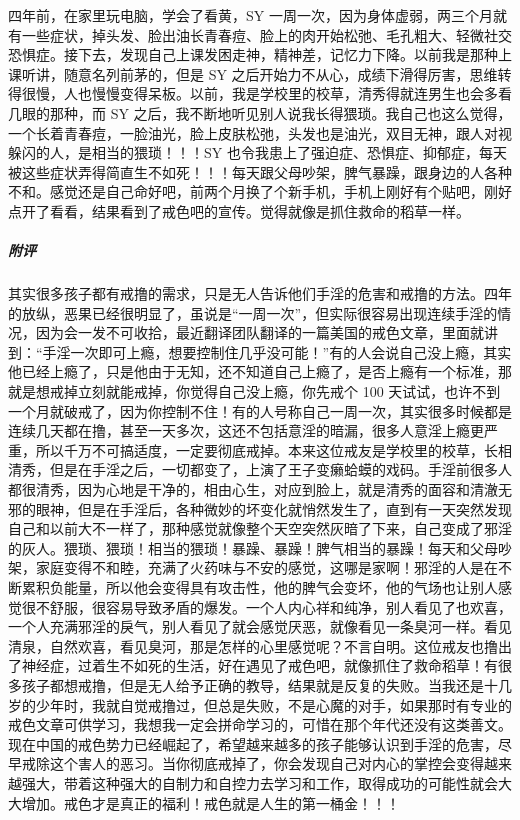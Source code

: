 \begin{case}
    四年前，在家里玩电脑，学会了看黄，SY 一周一次，因为身体虚弱，两三个月就有一些症状，掉头发、脸出油长青春痘、脸上的肉开始松弛、毛孔粗大、轻微社交恐惧症。接下去，发现自己上课发困走神，精神差，记忆力下降。以前我是那种上课听讲，随意名列前茅的，但是 SY 之后开始力不从心，成绩下滑得厉害，思维转得很慢，人也慢慢变得呆板。以前，我是学校里的校草，清秀得就连男生也会多看几眼的那种，而 SY 之后，我不断地听见别人说我长得猥琐。我自己也这么觉得，一个长着青春痘，一脸油光，脸上皮肤松弛，头发也是油光，双目无神，跟人对视躲闪的人，是相当的猥琐！！！SY 也令我患上了强迫症、恐惧症、抑郁症，每天被这些症状弄得简直生不如死！！！每天跟父母吵架，脾气暴躁，跟身边的人各种不和。感觉还是自己命好吧，前两个月换了个新手机，手机上刚好有个贴吧，刚好点开了看看，结果看到了戒色吧的宣传。觉得就像是抓住救命的稻草一样。
    \subparagraph{附评} 其实很多孩子都有戒撸的需求，只是无人告诉他们手淫的危害和戒撸的方法。四年的放纵，恶果已经很明显了，虽说是“一周一次”，但实际很容易出现连续手淫的情况，因为会一发不可收拾，最近翻译团队翻译的一篇美国的戒色文章，里面就讲到：“手淫一次即可上瘾，想要控制住几乎没可能！”有的人会说自己没上瘾，其实他已经上瘾了，只是他由于无知，还不知道自己上瘾了，是否上瘾有一个标准，那就是想戒掉立刻就能戒掉，你觉得自己没上瘾，你先戒个 100 天试试，也许不到一个月就破戒了，因为你控制不住！有的人号称自己一周一次，其实很多时候都是连续几天都在撸，甚至一天多次，这还不包括意淫的暗漏，很多人意淫上瘾更严重，所以千万不可搞适度，一定要彻底戒掉。本来这位戒友是学校里的校草，长相清秀，但是在手淫之后，一切都变了，上演了王子变癞蛤蟆的戏码。手淫前很多人都很清秀，因为心地是干净的，相由心生，对应到脸上，就是清秀的面容和清澈无邪的眼神，但是在手淫后，各种微妙的坏变化就悄然发生了，直到有一天突然发现自己和以前大不一样了，那种感觉就像整个天空突然灰暗了下来，自己变成了邪淫的灰人。猥琐、猥琐！相当的猥琐！暴躁、暴躁！脾气相当的暴躁！每天和父母吵架，家庭变得不和睦，充满了火药味与不安的感觉，这哪是家啊！邪淫的人是在不断累积负能量，所以他会变得具有攻击性，他的脾气会变坏，他的气场也让别人感觉很不舒服，很容易导致矛盾的爆发。一个人内心祥和纯净，别人看见了也欢喜，一个人充满邪淫的戾气，别人看见了就会感觉厌恶，就像看见一条臭河一样。看见清泉，自然欢喜，看见臭河，那是怎样的心里感觉呢？不言自明。这位戒友也撸出了神经症，过着生不如死的生活，好在遇见了戒色吧，就像抓住了救命稻草！有很多孩子都想戒撸，但是无人给予正确的教导，结果就是反复的失败。当我还是十几岁的少年时，我就自觉戒撸过，但总是失败，不是心魔的对手，如果那时有专业的戒色文章可供学习，我想我一定会拼命学习的，可惜在那个年代还没有这类善文。现在中国的戒色势力已经崛起了，希望越来越多的孩子能够认识到手淫的危害，尽早戒除这个害人的恶习。当你彻底戒掉了，你会发现自己对内心的掌控会变得越来越强大，带着这种强大的自制力和自控力去学习和工作，取得成功的可能性就会大大增加。戒色才是真正的福利！戒色就是人生的第一桶金！！！
\end{case}

